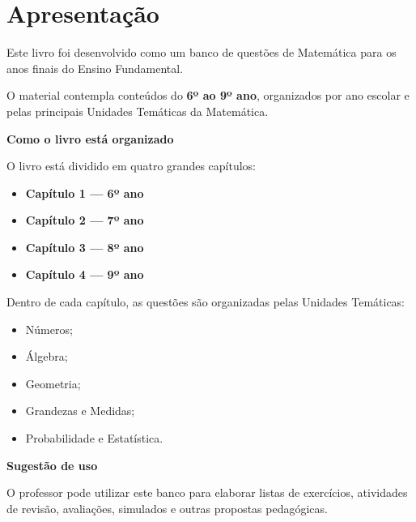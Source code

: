 \chapter*{Apresentação}

\begin{caixainfo}

Este livro foi desenvolvido como um banco de questões de Matemática
para os anos finais do Ensino Fundamental.

O material contempla conteúdos do \textbf{6º ao 9º ano}, organizados
por ano escolar e pelas principais Unidades Temáticas da Matemática.

\end{caixainfo}

\vspace{1cm}

\textbf{Como o livro está organizado}

O livro está dividido em quatro grandes capítulos:

\begin{itemize}
    \item \textbf{Capítulo 1 — 6º ano}
    \item \textbf{Capítulo 2 — 7º ano}
    \item \textbf{Capítulo 3 — 8º ano}
    \item \textbf{Capítulo 4 — 9º ano}
\end{itemize}

Dentro de cada capítulo, as questões são organizadas pelas Unidades
Temáticas:

\begin{itemize}
    \item Números;
    \item Álgebra;
    \item Geometria;
    \item Grandezas e Medidas;
    \item Probabilidade e Estatística.
\end{itemize}

\begin{caixadica}

\textbf{Sugestão de uso}

O professor pode utilizar este banco para elaborar listas de exercícios,
atividades de revisão, avaliações, simulados e outras propostas
pedagógicas.

\end{caixadica}

\cleardoublepage